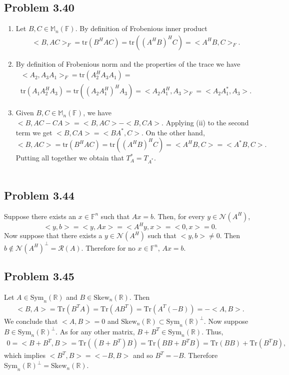 \documentclass[letterpaper,12pt]{article}
\theoremstyle{definition}
\begin{document}
\begin{spacing}{1.3}{}
\subsection*{Problem 3.40}
\begin{enumerate}
    \item
    Let $B,C\in\mathbb M_n(\mathbb F)$.
	By definition of Frobenious inner product
	\begin{align*}
	<B,AC>_F=\text{tr}(B^HAC)=\text{tr}((A^HB)^HC)=<A^HB,C>_F.
	\end{align*}
	\item
		By definition of Frobenious norm and the properties of the trace we have
	\begin{align*}
	<A_2,A_3A_1>_F=\text{tr}(A_2^HA_3A_1)=\\
	\text{tr}(A_1A_2^HA_3)=\text{tr}((A_2A_1^H)^HA_3)=
	<A_2A_1^H,A_3>_F=<A_2A_1^*,A_3>.
	\end{align*}
	\item
		Given $B,C\in\mathbb M_n(\mathbb F)$, we have $<B,AC-CA>=<B,AC>-<B,CA>$.
	Applying (ii) to the second term we get $<B,CA>=<BA^*,C>$.
	On the other hand,
	\begin{equation*}
	<B,AC>=\text{tr}(B^HAC)=\text{tr}((A^HB)^HC)=<A^HB,C>=<A^*B,C>.
	\end{equation*}
	Putting all together we obtain that $T_A^*=T_{A^*}$. \\\\
\end{enumerate}


\subsection*{Problem 3.44}
	Suppose there exists an $x\in\mathbb F^n$ such that $Ax=b$.
	Then, for every $y\in\mathcal N(A^H)$,
	$$<y,b>=<y,Ax>=<A^Hy,x>=<0,x>=0.$$
	Now suppose that there exists a $y\in\mathcal N(A^H)$ such that $<y,b>\neq0$.
	Then $b\notin\mathcal N(A^H)^\perp=\mathcal R(A)$.
	Therefore for no $x\in\mathbb F^n$, $Ax=b$. \\

\subsection*{Problem 3.45}
	Let $A\in\text{Sym}_n(\mathbb R)$ and $B\in\text{Skew}_n(\mathbb R)$.
	Then
	\begin{align*}
	<B,A>=\text{Tr}(B^TA)=\text{Tr}(AB^T)=
	\text{Tr}(A^T(-B))=-<A,B>.
	\end{align*}
	We conclude that $<A,B>=0$ and $\text{Skew}_n(\mathbb R)\subset\text{Sym}_n(\mathbb R)^\perp$.
	Now suppose $B\in\text{Sym}_n(\mathbb R)^\perp$.
	As for any other matrix, $B+B^T\in\text{Sym}_n(\mathbb R)$.
	Thus,
	\begin{align*}
	0 = <B+B^T,B>=\text{Tr}((B+B^T)B) =\text{Tr}(BB + B^TB)=
	\text{Tr}(BB)+\text{Tr}(B^TB),
	\end{align*}
	which implies $<B^T,B>=<-B,B>$ and so $B^T=-B$.
	Therefore $\text{Sym}_n(\mathbb R)^\perp=\text{Skew}_n(\mathbb R)$. \\


\end{spacing}
\end{document}
